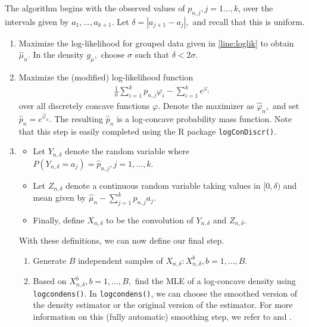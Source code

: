 \documentclass[12pt]{article} %
\newcommand{\comH}[1]{{\noindent \color{blue}#1}}
\begin{document}
The algorithm begins with the observed values of $p_{n,j}, j=1\ldots, k$, over the intervals given by $a_1, \ldots, a_{k+1}.$   Let $\delta = |a_{j+1}-a_j|,$ and recall that this is uniform.  
\begin{enumerate}
     \item  Maximize the log-likelihood for grouped data given in \eqref{line:loglik} to obtain $\widehat \mu_n$.  In the density $g_{\mu},$ choose $\sigma$ such that $\delta<2\sigma.$
   \item  Maximize the (modified) log-likelihood function
   \begin{eqnarray*}
   \frac{1}{n} \sum_{i=1}^k p_{n,j} \varphi_i -\sum_{i=1}^k e^{\varphi_i}
   \end{eqnarray*}
   over all discretely concave functions $\varphi.$  Denote the maximizer as $\widehat \varphi_n,$ and set $\widehat p_n=e^{\widehat \varphi_n}$. The resulting $\widehat p_n$ is a log-concave probability mass function.   Note that this step is easily completed using the R package \texttt{logConDiscr()}.   %
    \item  
    \begin{itemize}
    \item[--] Let $Y_{n,\delta}$ denote the random variable where $P(Y_{n,\delta} = a_j) = \widehat p_{n,j}, j=1, \ldots, k.$  
     \item[--] Let $ Z_{n,\delta}$ denote a continuous random variable taking values in $[0, \delta)$ and mean given by $\widehat \mu_n - \sum_{j=1}^k p_{n,j} a_j.$   
     \item[--] Finally, define $X_{n,\delta}$ to be the convolution of $ Y_{n,\delta}$ and $ Z_{n,\delta}.$    
    \end{itemize}
    
   With these definitions, we can now define our final step.   
\begin{enumerate}
\item Generate $B$ independent samples of $X_{n,\delta}: X_{n,\delta}^b, b=1, \ldots, B.$   %
\item Based on $X_{n,\delta}^b, b=1, \ldots, B,$ find the MLE of a log-concave density using \texttt{logcondens()}.   In \texttt{logcondens()}, we can choose the smoothed version of the density estimator or the original version of the estimator.   For more information on this (fully automatic) smoothing step, we refer to \citet{dumbgen2009logcondens} and \citet{chenSam2013}. %
\end{enumerate}
\end{enumerate}
\end{document}

